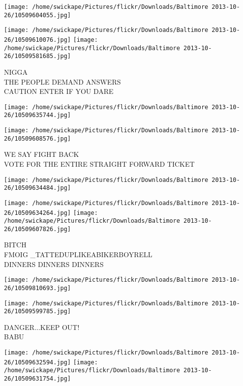 \documentclass[10pt,letterpaper]{article}
\begin{document}
\texttt{[image: /home/swickape/Pictures/flickr/Downloads/Baltimore 2013-10-26/10509604055.jpg]}

\vspace{0.25in}
\texttt{[image: /home/swickape/Pictures/flickr/Downloads/Baltimore 2013-10-26/10509610076.jpg]}
\texttt{[image: /home/swickape/Pictures/flickr/Downloads/Baltimore 2013-10-26/10509581685.jpg]}

NIGGA\\
THE PEOPLE DEMAND ANSWERS\\
CAUTION ENTER IF YOU DARE
\pagebreak

\texttt{[image: /home/swickape/Pictures/flickr/Downloads/Baltimore 2013-10-26/10509635744.jpg]}

\vspace{0.25in}
\texttt{[image: /home/swickape/Pictures/flickr/Downloads/Baltimore 2013-10-26/10509608576.jpg]}

WE SAY FIGHT BACK\\
VOTE FOR THE ENTIRE STRAIGHT FORWARD TICKET
\pagebreak

\texttt{[image: /home/swickape/Pictures/flickr/Downloads/Baltimore 2013-10-26/10509634484.jpg]}

\vspace{0.25in}
\texttt{[image: /home/swickape/Pictures/flickr/Downloads/Baltimore 2013-10-26/10509634264.jpg]}
\texttt{[image: /home/swickape/Pictures/flickr/Downloads/Baltimore 2013-10-26/10509607826.jpg]}

BITCH\\
FMOIG \_TATTEDUPLIKEABIKERBOYRELL\\
DINNERS DINNERS DINNERS
\pagebreak

\texttt{[image: /home/swickape/Pictures/flickr/Downloads/Baltimore 2013-10-26/10509810693.jpg]}

\vspace{0.25in}
\texttt{[image: /home/swickape/Pictures/flickr/Downloads/Baltimore 2013-10-26/10509599785.jpg]}

DANGER...KEEP OUT!\\
BABU
\pagebreak

\texttt{[image: /home/swickape/Pictures/flickr/Downloads/Baltimore 2013-10-26/10509632594.jpg]}
\texttt{[image: /home/swickape/Pictures/flickr/Downloads/Baltimore 2013-10-26/10509631754.jpg]}
\end{document}
